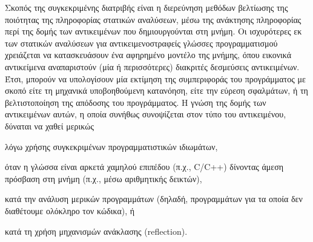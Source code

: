 


Σκοπός της συγκεκριμένης διατριβής είναι η διερεύνηση μεθόδων
βελτίωσης της ποιότητας της πληροφορίας στατικών αναλύσεων, μέσω της
ανάκτησης πληροφορίας περί της δομής των αντικειμένων που
δημιουργούνται στη μνήμη.  Οι ισχυρότερες εκ των στατικών αναλύσεων
για αντικειμενοστραφείς γλώσσες προγραμματισμού χρειάζεται να
κατασκευάσουν ένα αφηρημένο μοντέλο της μνήμης, όπου εικονικά
αντικείμενα αναπαριστούν (μία ή περισσότερες) διακριτές δεσμεύσεις
αντικειμένων.  Έτσι, μπορούν να υπολογίσουν μία εκτίμηση της
συμπεριφοράς του προγράμματος με σκοπό είτε τη μηχανικά υποβοηθούμενη
κατανόηση, είτε την εύρεση σφαλμάτων, ή τη βελτιστοποίηση της
απόδοσης του προγράμματος.  Η γνώση της δομής των αντικειμένων αυτών,
η οποία συνήθως συνοψίζεται στον τύπο του αντικειμένου, δύναται να
χαθεί μερικώς
\begin{inparaenum}[(1)]
\item λόγω χρήσης συγκεκριμένων προγραμματιστικών ιδιωμάτων,
\item όταν η γλώσσα είναι αρκετά χαμηλού επιπέδου (π.χ., {\en C/C++})
  δίνοντας άμεση πρόσβαση στη μνήμη (π.χ., μέσω αριθμητικής δεικτών),
\item κατά την ανάλυση μερικών προγραμμάτων (δηλαδή, προγραμμάτων για
  τα οποία δεν διαθέτουμε ολόκληρο τον κώδικα), ή
\item κατά τη χρήση μηχανισμών ανάκλασης ({\en reflection}).
\end{inparaenum}

